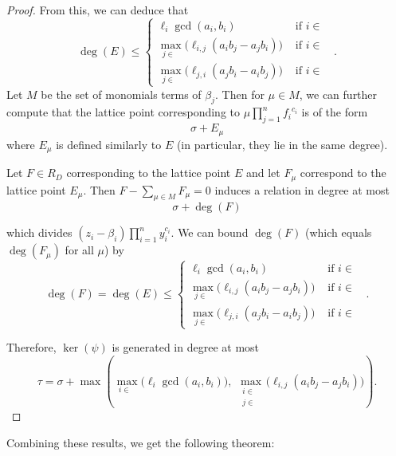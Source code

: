 \documentclass{amsart}
\theoremstyle{plain}
\theoremstyle{definition}
\theoremstyle{remark}
\numberwithin{equation}{section}
\newcommand\bida{a}
\newcommand\bidb{b}
\DeclareMathOperator{\Te}{T_=}
\DeclareMathOperator{\Tp}{T_+}
\DeclareMathOperator{\Tm}{T_-}
\begin{document}
\begin{proof}
\noindent
From this, we can deduce that
\[
	\deg(E) \le \begin{cases}
	\ell_i \gcd(\bida_i, \bidb_i)	&\mbox{ if } i \in \Te \\
	\max_{j \in \Tm} \bigl(\ell_{i, j} (\bida_i \bidb_j - \bida_j \bidb_i)\bigr)
	&\mbox{ if } i \in \Tp \\
	\max_{j \in \Tp} \bigl(\ell_{j, i} (\bida_j \bidb_ i - \bida_i \bidb_j) \bigr)
	&\mbox{ if } i \in \Tm \end{cases}.
\]
Let $M$ be the set of monomials terms of $\beta_j$.  Then for $\mu\in M$, we can further compute that the lattice point corresponding to $\mu \prod_{j=1}^n {f_i}^{c_i}$ is of the form
\[
	\sigma + E_\mu
\]
where $E_\mu$ is defined similarly to $E$ (in particular, they lie in the same degree).

Let $F\in R_D$ corresponding to the lattice point $E$ and let $F_\mu$ correspond to the lattice point $E_\mu$.  
Then $F - \sum_{\mu \in M} F_\mu = 0$ induces a
relation in degree at most
\[
	\sigma + \deg(F)
\]

\noindent
which divides $(z_i - \beta_i) \prod_{i = 1}^n y_i^{c_i}$.
We can bound $\deg(F)$ (which equals $\deg(F_\mu)$ for all $\mu$) by
\[
	\deg(F) = \deg(E) \le \begin{cases}
	\ell_i \gcd(\bida_i, \bidb_i)	&\mbox{ if } i \in \Te \\
	\max_{j \in \Tm} \bigl(\ell_{i, j} (\bida_i \bidb_j - \bida_j \bidb_i)\bigr)
	&\mbox{ if } i \in \Tp \\
	\max_{j \in \Tp} \bigl(\ell_{j, i} (\bida_j \bidb_ i - \bida_i \bidb_j) \bigr)
	&\mbox{ if } i \in \Tm \end{cases}.
\]

\noindent
Therefore, $\ker(\psi)$ is generated in degree at most
\[
	\tau = \sigma
	+ \max \left(\max_{i\in \Te} \bigl(\ell_i \gcd(a_i, b_i) \bigr),
	\; \max_{\substack{i \in \Tp \\ j \in \Tm}} \bigl(\ell_{i, j}
	(\bida_i \bidb_j - \bida_j
	\bidb_i) \bigr) \right).
\]
\end{proof}

Combining these results, we get the following theorem:
\end{document}
